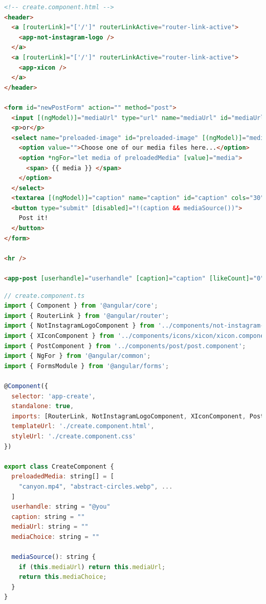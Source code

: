 \documentclass[a4paper, 10pt]{article}
\begin{document}
\begin{lstlisting}[caption=Create page in Angular (Template), label={lst:Angular:Create:Template}, language=HTML]
<!-- create.component.html -->
<header>
  <a [routerLink]="['/']" routerLinkActive="router-link-active">
    <app-not-instagram-logo />
  </a>
  <a [routerLink]="['/']" routerLinkActive="router-link-active">
    <app-xicon />
  </a>
</header>

<form id="newPostForm" action="" method="post">
  <input [(ngModel)]="mediaUrl" type="url" name="mediaUrl" id="mediaUrl" placeholder="Insert your media URL here..." />
  <p>or</p>
  <select name="preloaded-image" id="preloaded-image" [(ngModel)]="mediaChoice">
    <option value="">Choose one of our media files here...</option>
    <option *ngFor="let media of preloadedMedia" [value]="media">
      <span> {{ media }} </span>
    </option>
  </select>
  <textarea [(ngModel)]="caption" name="caption" id="caption" cols="30" rows="3" placeholder="Type your caption here" />
  <button type="submit" [disabled]="!(caption && mediaSource())">
    Post it!
  </button>
</form>

<hr />

<app-post [userhandle]="userhandle" [caption]="caption" [likeCount]="0" [mediaSource]="mediaUrl || mediaChoice" [hideActionIcons]="true" />
\end{lstlisting}

\begin{lstlisting}[caption=Create page in Angular (Module), label={lst:Angular:Create:Module}, language=JavaScript]
// create.component.ts
import { Component } from '@angular/core';
import { RouterLink } from '@angular/router';
import { NotInstagramLogoComponent } from '../components/not-instagram-logo/not-instagram-logo.component';
import { XIconComponent } from '../components/icons/xicon/xicon.component';
import { PostComponent } from '../components/post/post.component';
import { NgFor } from '@angular/common';
import { FormsModule } from '@angular/forms';
  
@Component({
  selector: 'app-create',
  standalone: true,
  imports: [RouterLink, NotInstagramLogoComponent, XIconComponent, PostComponent, NgFor, FormsModule],
  templateUrl: './create.component.html',
  styleUrl: './create.component.css'
})

export class CreateComponent {
  preloadedMedia: string[] = [
    "canyon.mp4", "abstract-circles.webp", ...
  ]
  userhandle: string = "@you"
  caption: string = ""
  mediaUrl: string = ""
  mediaChoice: string = ""

  mediaSource(): string {
    if (this.mediaUrl) return this.mediaUrl;
    return this.mediaChoice;
  }
}
\end{lstlisting}
\end{document}
